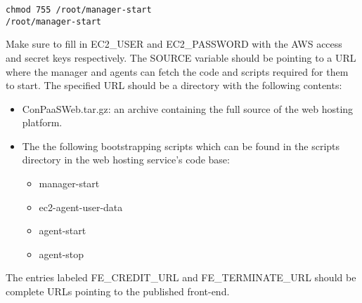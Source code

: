 \documentclass[12pt]{article}
\newenvironment{framedbox}[1]%
{\begin{framed}
 \begingroup
 \fontsize{#1}{#1}\selectfont
}
{
 \endgroup
 \end{framed}
}
\begin{document}
\begin{enumerate}
\begin{framedbox}{8pt}
\begin{verbatim}
chmod 755 /root/manager-start
/root/manager-start
\end{verbatim}\end{framedbox}
Make sure to fill in EC2\_USER and EC2\_PASSWORD with the AWS access and secret
keys respectively. The SOURCE variable should be pointing to a URL where the
manager and agents can fetch the code and scripts required for them to start.
The specified URL should be a directory with the following contents:
\begin{itemize}
\item ConPaaSWeb.tar.gz: an archive containing the full source of the web
      hosting platform.
\item The the following bootstrapping scripts which can be found in the scripts
      directory in the web hosting service's code base:
  \begin{itemize}
    \item manager-start
    \item ec2-agent-user-data
    \item agent-start
    \item agent-stop
  \end{itemize}
\end{itemize}
The entries labeled FE\_CREDIT\_URL and FE\_TERMINATE\_URL should be complete
URLs pointing to the published front-end.



\end{enumerate}
\end{document}
